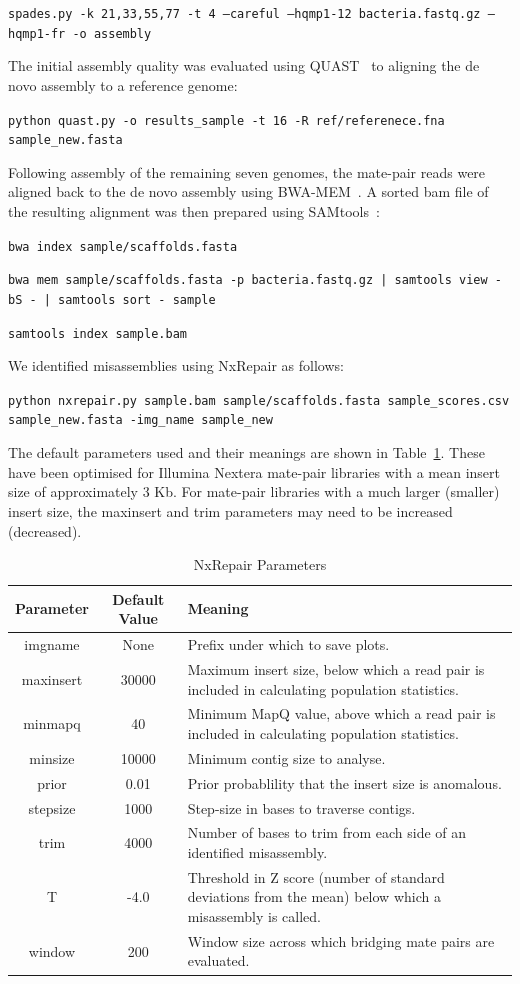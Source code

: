 \documentclass[12pt]{article}
\begin{document}
\texttt{spades.py -k 21,33,55,77 -t 4 --careful --hqmp1-12 bacteria.fastq.gz  --hqmp1-fr -o assembly}

The initial assembly quality was evaluated using QUAST~\cite{gurevich2013} to aligning the de novo assembly to a reference genome:

\texttt{python quast.py -o results\_sample -t 16   -R ref/referenece.fna sample\_new.fasta }

Following assembly of the remaining seven genomes, the mate-pair reads were aligned back to the de novo assembly using BWA-MEM~\cite{li2013}. A sorted bam file of the resulting alignment was then prepared using SAMtools~\cite{li2009}: 

\texttt{bwa index sample/scaffolds.fasta}

\texttt{bwa mem sample/scaffolds.fasta -p bacteria.fastq.gz | samtools view -bS - |  samtools sort - sample}

\texttt{samtools index sample.bam}

We identified misassemblies using NxRepair as follows:

\texttt{python nxrepair.py sample.bam   sample/scaffolds.fasta sample\_scores.csv  sample\_new.fasta -img\_name sample\_new}


The default parameters used and their meanings are shown in Table~\ref{tab:parameters}. These have been optimised for Illumina Nextera mate-pair libraries with a mean insert size of approximately 3 Kb. For mate-pair libraries with a much larger (smaller) insert size, the maxinsert and trim parameters may need to be increased (decreased).

\begin{table}
\begin{center}
\begin{tabular}{|c|c|p{8cm}|}
    \hline
    Parameter & Default Value & Meaning \\ \hline
    imgname & None & Prefix under which to save plots. \\
    maxinsert & 30000 &  Maximum insert size, below which a read pair is included in calculating population statistics.\\
    minmapq & 40 & Minimum MapQ value, above which a read pair is included in calculating population statistics.\\
    minsize & 10000 & Minimum contig size to analyse.\\ 
    prior & 0.01 & Prior probablility that the insert size is anomalous.\\
    stepsize & 1000 & Step-size in bases to traverse contigs.\\
    trim & 4000 & Number of bases to trim from each side of an identified misassembly.\\
    T & -4.0 & Threshold in Z score (number of standard deviations from the mean) below which a misassembly is called.\\
    window & 200 & Window size across which bridging mate pairs are evaluated.\\ \hline
\end{tabular}
\end{center}
\caption{NxRepair Parameters \label{tab:parameters}}
\end{table}
\end{document}
